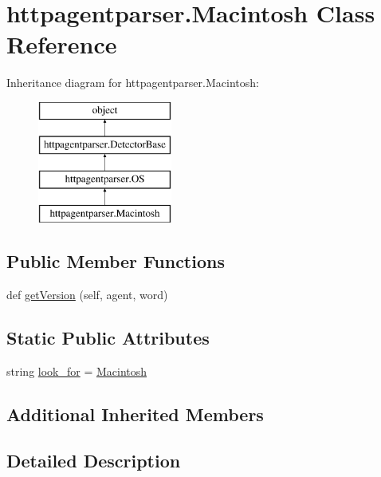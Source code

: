 \hypertarget{classhttpagentparser_1_1_macintosh}{}\section{httpagentparser.\+Macintosh Class Reference}
\label{classhttpagentparser_1_1_macintosh}
Inheritance diagram for httpagentparser.\+Macintosh\+:\begin{figure}[H]
\begin{center}
\leavevmode
\includegraphics[height=4.000000cm]{classhttpagentparser_1_1_macintosh}
\end{center}
\end{figure}
\subsection*{Public Member Functions}
\begin{DoxyCompactItemize}
\item 
def \hyperlink{classhttpagentparser_1_1_macintosh_a463a7e6d038417b6594e02726a49ae5e}{get\+Version} (self, agent, word)
\end{DoxyCompactItemize}
\subsection*{Static Public Attributes}
\begin{DoxyCompactItemize}
\item 
string \hyperlink{classhttpagentparser_1_1_macintosh_a6604bdab4a52842bf843cfaf1de2a0ba}{look\+\_\+for} = \textquotesingle{}\hyperlink{classhttpagentparser_1_1_macintosh}{Macintosh}\textquotesingle{}
\end{DoxyCompactItemize}
\subsection*{Additional Inherited Members}


\subsection{Detailed Description}



